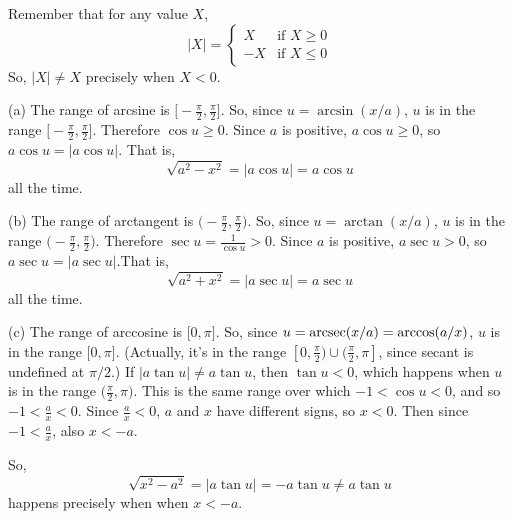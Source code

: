 \begin{solution}
Remember that for any value $X$,
\[|X| = \left\{\begin{array}{rl}
X&\mbox{if }X \ge 0\\
-X&\mbox{if }X \le 0
\end{array}\right.\]
So, $|X| \neq X$ precisely when $X<0$.

(a) The range of arcsine is $\big[-\frac{\pi}{2},\frac{\pi}{2}\big]$. So, since $u=\arcsin(x/a)$, $u$ is in the range $\big[-\frac{\pi}{2},\frac{\pi}{2}\big]$. Therefore $\cos u \geq 0$. Since $a$ is positive, $a\cos u \ge 0$, so $a\cos u = |a\cos u|$. That is,
\[\sqrt{a^2-x^2}=|a\cos u|=a\cos u\]
all the time.

(b) The range of arctangent is $\big(-\frac{\pi}{2},\frac{\pi}{2}\big)$. So, since $u=\arctan(x/a)$, $u$ is in the range $\big(-\frac{\pi}{2},\frac{\pi}{2}\big)$. Therefore $\sec u = \frac{1}{\cos u} >0 $. Since $a$ is positive, $a\sec u > 0$, so $a\sec u = |a\sec u|$.That is,
\[\sqrt{a^2+x^2}=|a\sec u|=a\sec u\]
all the time.

(c) The range of arccosine is $\big[0,\pi \big]$. So, since $u=\mathop{\mathrm{arcsec}}(x/a) = \arccos(a/x)$, $u$ is in the range $\big[0,\pi\big]$. (Actually, it's in the range $[0,\frac{\pi}{2}) \cup (\frac{\pi}{2},\pi]$, since secant is undefined at $\pi/2$.) If $|a\tan u| \neq a\tan u$, then $\tan u <0$, which happens when $u$ is in the range $\big (\frac{\pi}{2},\pi)$. This is the same range over which $-1<\cos u <0$, and so $-1<\frac{a}{x}<0$.
Since $\frac{a}{x}<0$, $a$ and $x$ have different signs, so $x<0$.  Then since $-1<\frac{a}{x}$, also $x<-a$.

So,
\[\sqrt{x^2-a^2} = |a\tan u| = -a\tan u \neq a\tan u\]
happens precisely when  when $x< -a$.
\end{solution}
